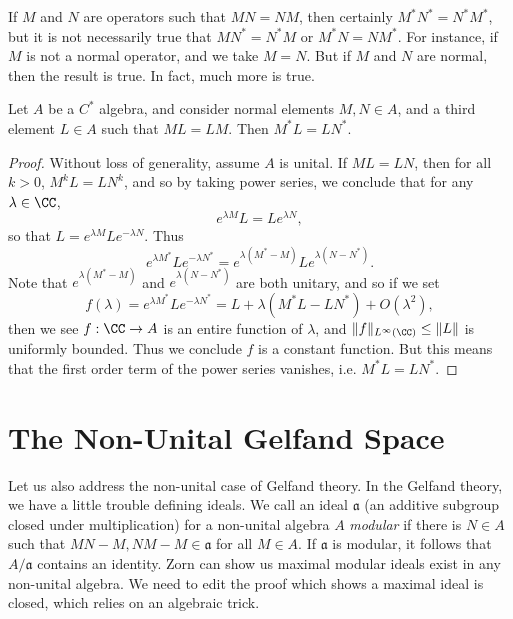 If $M$ and $N$ are operators such that $MN = NM$, then certainly $M^*N^* = N^*M^*$, but it is not necessarily true that $MN^* = N^* M$ or $M^* N = N M^*$. For instance, if $M$ is not a normal operator, and we take $M = N$. But if $M$ and $N$ are normal, then the result is true. In fact, much more is true.

\begin{theorem}
    Let $A$ be a $C^*$ algebra, and consider normal elements $M,N \in A$, and a third element $L \in A$ such that $ML = LM$. Then $M^* L = L N^*$.
\end{theorem}
\begin{proof}
    Without loss of generality, assume $A$ is unital. If $ML = LN$, then for all $k > 0$, $M^kL = LN^k$, and so by taking power series, we conclude that for any $\lambda \in \CC$,
    \[ e^{\lambda M} L = L e^{\lambda N}, \]
    so that $L = e^{\lambda M} L e^{- \lambda N}$. Thus
    \[ e^{\lambda M^*} L e^{- \lambda N^*} = e^{\lambda (M^* - M)} L e^{\lambda (N - N^*)}. \]
    Note that $e^{\lambda(M^* - M)}$ and $e^{\lambda (N - N^*)}$ are both unitary, and so if we set
    \[ f(\lambda) = e^{\lambda M^*} L e^{- \lambda N^*} = L + \lambda (M^* L - L N^*) + O(\lambda^2), \]
    then we see $f: \CC \to A$ is an entire function of $\lambda$, and $\| f \|_{L^\infty(\CC)} \leq \| L \|$ is uniformly bounded. Thus we conclude $f$ is a constant function. But this means that the first order term of the power series vanishes, i.e. $M^* L = LN^*$.
\end{proof}

\section{The Non-Unital Gelfand Space}

Let us also address the non-unital case of Gelfand theory. In the Gelfand theory, we have a little trouble defining ideals. We call an ideal $\mathfrak{a}$ (an additive subgroup closed under multiplication) for a non-unital algebra $A$ \emph{modular} if there is $N \in A$ such that $MN - M, NM - M \in \mathfrak{a}$ for all $M \in A$. If $\mathfrak{a}$ is modular, it follows that $A/\mathfrak{a}$ contains an identity. Zorn can show us maximal modular ideals exist in any non-unital algebra. We need to edit the proof which shows a maximal ideal is closed, which relies on an algebraic trick.

